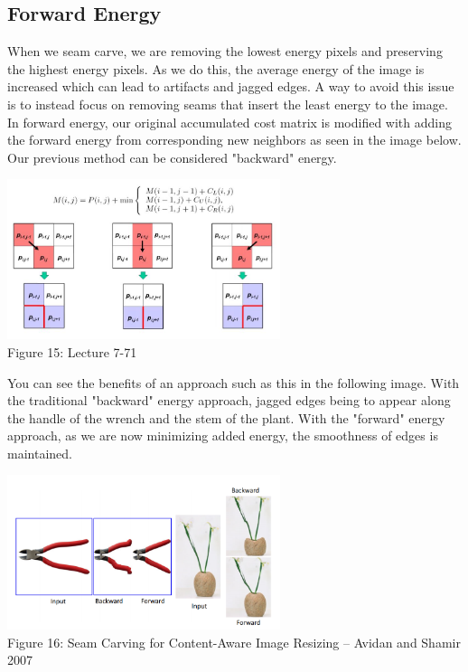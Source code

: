 \documentclass{article}
\begin{document}
\subsection{Forward Energy}
When we seam carve, we are removing the lowest energy pixels and preserving the highest energy pixels. As we do this, the average energy of the image is increased which can lead to artifacts and jagged edges. A way to avoid this issue is to instead focus on removing seams that insert the least energy to the image. In forward energy, our original accumulated cost matrix is modified with adding the forward energy from corresponding new neighbors as seen in the image below. Our previous method can be considered "backward" energy.

\begin{center}
\includegraphics[width=8cm]{forward_energy_calculation.JPG} \\
Figure 15: Lecture 7-71
\end{center}

You can see the benefits of an approach such as this in the following image. With the traditional "backward" energy approach, jagged edges being to appear along the handle of the wrench and the stem of the plant. With the "forward" energy approach, as we are now minimizing added energy, the smoothness of edges is maintained.

\begin{center}
\includegraphics[width=8cm]{forward_energy.PNG} \\
Figure 16: Seam	Carving	for	Content-Aware	Image	Resizing	– Avidan and	Shamir	2007
\end{center}
\end{document}
